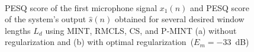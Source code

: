 \documentclass[draftcls,onecolumn,11pt]{IEEEtran}
\begin{document}
\begin{figure}[h]
\centering
\hbox{\hspace{-1.1cm}
}
\caption{PESQ score of the first microphone signal $x_1(n)$ and PESQ score of the system's output $\hat{s}(n)$ obtained for several desired window lengths $L_d$ using MINT, RMCLS, CS, and P-MINT (a) without regularization and (b) with optimal regularization~($E_m = -33$~dB)}
\end{figure}
\end{document}
